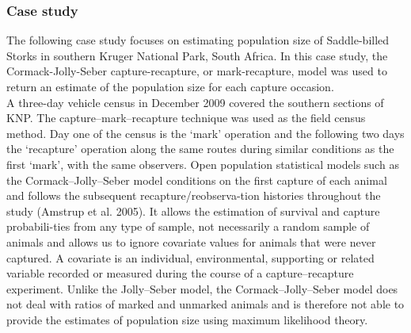 \documentclass[,oneside]{article}
\numberwithin{equation}{section}
\begin{document}
\subsubsection{Case study}
The following case study focuses on estimating population size of Saddle-billed Storks in southern Kruger National Park, South Africa. In this case study, the  Cormack-Jolly-Seber capture-recapture, or mark-recapture, model was used to return an estimate of the population size for each capture occasion.\\
A  three-day vehicle census in  December  2009  covered the southern sections of KNP. The capture–mark–recapture technique was used  as  the  field  census  method.  Day  one  of  the  census  is  the  ‘mark’  operation  and  the  following  two  days  the  ‘recapture’  operation  along  the  same  routes  during  similar  conditions  as the first ‘mark’, with the same observers. Open population statistical models such as the Cormack–Jolly–Seber model conditions on the first capture of each animal  and  follows  the  subsequent  recapture/reobserva-tion  histories  throughout  the  study  (Amstrup  et  al.  2005).  It  allows  the  estimation  of  survival  and  capture  probabili-ties  from  any  type  of  sample,  not  necessarily  a  random  sample of animals and allows us to ignore covariate values for  animals  that  were  never  captured.  A  covariate  is  an  individual,  environmental,  supporting  or  related  variable  recorded  or  measured  during  the  course  of  a  capture–recapture  experiment.  Unlike  the  Jolly–Seber  model,  the  Cormack–Jolly–Seber  model  does  not  deal  with  ratios  of  marked  and  unmarked  animals  and  is  therefore  not  able  to provide the estimates of population size using maximum likelihood theory. \cite{Ap96}
\end{document}
